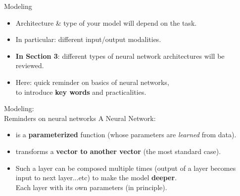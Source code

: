 \begin{frame}{Modeling}
\begin{itemize}
\item Architecture \& type of your model will depend on the task.\\
\item In particular: different input/output modalities.
\item \textbf{In Section 3}: different types of neural network architectures will be reviewed.
\item Here: quick reminder on basics of neural networks,\\
to introduce \textbf{key words} and practicalities.
\end{itemize}

\end{frame}

\begin{frame}{Modeling:\\Reminders on neural networks}
A Neural Network:
\begin{itemize}
\item is a \textbf{parameterized} function (whose parameters are \textit{learned} from data).\\
\pause
\item transforms a \textbf{vector to another vector} (the most standard case).\\
\pause
\item Such a layer can be composed multiple times (output of a layer becomes input to next layer...etc) to make the model \textbf{deeper}. \\Each layer with its own parameters (in principle).
\end{itemize}
\end{frame}


